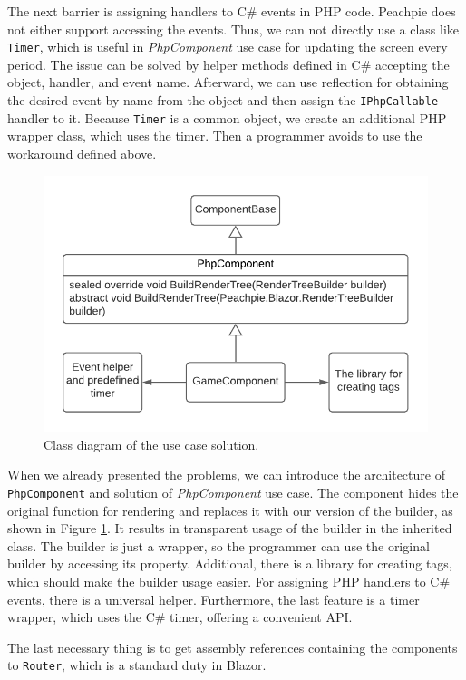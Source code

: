 \par
The next barrier is assigning handlers to C\# events in PHP code.
Peachpie does not either support accessing the events.
Thus, we can not directly use a class like \texttt{Timer}, which is useful in \textit{PhpComponent} use case for updating the screen every period.
The issue can be solved by helper methods defined in C\# accepting the object, handler, and event name.
Afterward, we can use reflection for obtaining the desired event by name from the object and then assign the \texttt{IPhpCallable} handler to it.
Because \texttt{Timer} is a common object, we create an additional PHP wrapper class, which uses the timer.
Then a programmer avoids to use the workaround defined above.
\par
\begin{figure}\centering
\includegraphics[scale=0.8]{./img/PhpComponentSolution}
\caption{Class diagram of the use case solution.}
\label{img17:solution}
\end{figure}
\par
When we already presented the problems, we can introduce the architecture of \texttt{PhpComponent} and solution of \textit{PhpComponent} use case.
The component hides the original function for rendering and replaces it with our version of the builder, as shown in Figure \ref{img17:solution}.
It results in transparent usage of the builder in the inherited class.
The builder is just a wrapper, so the programmer can use the original builder by accessing its property.
Additional, there is a library for creating tags, which should make the builder usage easier.
For assigning PHP handlers to C\# events, there is a universal helper.
Furthermore, the last feature is a timer wrapper, which uses the C\# timer, offering a convenient API.
\par
The last necessary thing is to get assembly references containing the components to \texttt{Router}, which is a standard duty in Blazor.
